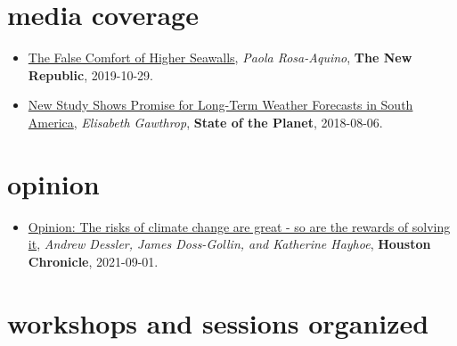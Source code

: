 \documentclass[10pt,oneside]{article}
\begin{document}
\section{media coverage}

\mbox{}\vspace{-\dimexpr\baselineskip\relax}

\begin{itemize}[label={}]

  \item \href{https://newrepublic.com/article/155519/false-comfort-higher-seawalls}{The False Comfort of Higher Seawalls}, \textit{Paola Rosa-Aquino}, \textbf{The New Republic}, 2019-10-29.

  \item \href{https://blogs.ei.columbia.edu/2018/08/06/subseasonal-weather-forecasts-paraguay/}{New Study Shows Promise for Long-Term Weather Forecasts in South America}, \textit{Elisabeth Gawthrop}, \textbf{State of the Planet}, 2018-08-06.

\end{itemize}

\section{opinion}

\mbox{}\vspace{-\dimexpr\baselineskip\relax}

\begin{itemize}[label={}]

  \item \href{https://www.houstonchronicle.com/opinion/outlook/article/Opinion-The-risks-of-climate-change-are-great-16426616.php}{Opinion: The risks of climate change are great - so are the rewards of solving it}, \textit{Andrew Dessler, James Doss-Gollin, and Katherine Hayhoe}, \textbf{Houston Chronicle}, 2021-09-01.

\end{itemize}


\section{workshops and sessions organized}

\mbox{}\vspace{-\dimexpr\baselineskip\relax}
\end{document}
